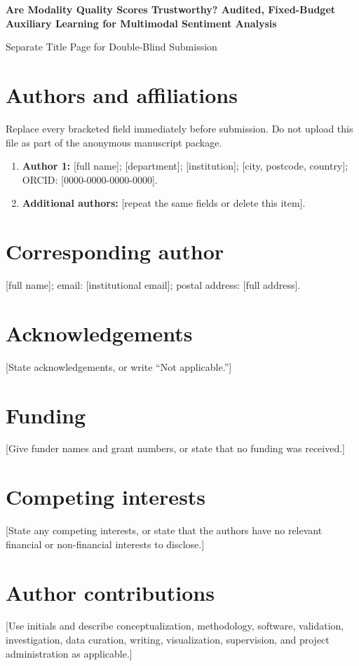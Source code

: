 \documentclass[11pt]{article}
\begin{document}
\begin{center}
{\Large\bfseries Are Modality Quality Scores Trustworthy? Audited,
Fixed-Budget Auxiliary Learning for Multimodal Sentiment Analysis\par}
\vspace{1.5em}
{\large Separate Title Page for Double-Blind Submission\par}
\end{center}

\section*{Authors and affiliations}

Replace every bracketed field immediately before submission. Do not upload this
file as part of the anonymous manuscript package.

\begin{enumerate}[leftmargin=*]
\item \textbf{Author 1:} [full name]; [department]; [institution]; [city,
  postcode, country]; ORCID: [0000-0000-0000-0000].
\item \textbf{Additional authors:} [repeat the same fields or delete this item].
\end{enumerate}

\section*{Corresponding author}

[full name]; email: [institutional email]; postal address: [full address].

\section*{Acknowledgements}

[State acknowledgements, or write ``Not applicable.'']

\section*{Funding}

[Give funder names and grant numbers, or state that no funding was received.]

\section*{Competing interests}

[State any competing interests, or state that the authors have no relevant
financial or non-financial interests to disclose.]

\section*{Author contributions}

[Use initials and describe conceptualization, methodology, software,
validation, investigation, data curation, writing, visualization, supervision,
and project administration as applicable.]
\end{document}

